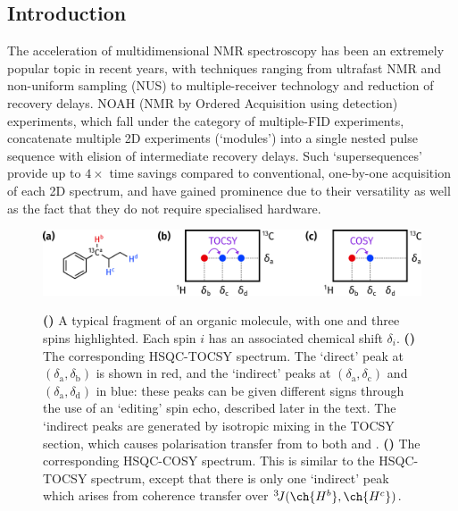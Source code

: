 \documentclass[a4paper,12pt]{article}
\newcommand{\proton}{\ch{^{1}H}}
\newcommand{\carbon}{\ch{^{13}C}}
\begin{document}
\begin{refsection}
\clearpage

\section{Introduction}

The acceleration of multidimensional NMR spectroscopy has been an extremely popular topic in recent years, with techniques ranging from ultrafast NMR\autocite{Frydman2002PNASUSA,Pelupessy2003JACS,Frydman2003JACS} and non-uniform sampling (NUS)\autocite{Kazimierczuk2010PNMRS,Mobli2014PNMRS,Kazimierczuk2015MRC} to multiple-receiver technology\autocite{Kupce2006JACS,Kupce2008JACS,Kovacs2016MRC} and reduction of recovery delays\autocite{Kupce2007MRC,SchulzeSunninghausen2014JACS,Becker2019JMR}.
NOAH (NMR by Ordered Acquisition using \proton{} detection) experiments\autocite{Kupce2017ACIE}, which fall under the category of multiple-FID experiments\autocite{Yong2023RSCBook}, concatenate multiple 2D experiments (`modules') into a single nested pulse sequence with elision of intermediate recovery delays.
Such `supersequences' provide up to $4\times$ time savings compared to conventional, one-by-one acquisition of each 2D spectrum, and have gained prominence due to their versatility as well as the fact that they do not require specialised hardware.

\begin{figure}[!ht]
    \centering
    \includegraphics[]{intro.png}%
    {\label{fig:intro_molecular_structure}}%
    {\label{fig:intro_hsqc_tocsy}}%
    {\label{fig:intro_hsqc_cosy}}%
    \caption[Mockup illustrating salient features of HSQC-TOCSY and -COSY spectra]{
        \textbf{()} A typical fragment of an organic molecule, with one \carbon{} and three \proton{} spins highlighted.
        Each spin $i$ has an associated chemical shift $\delta_i$.
        \textbf{()} The corresponding HSQC-TOCSY spectrum.
        The `direct' peak at $(\delta_{\mathrm{a}}, \delta_{\mathrm{b}})$ is shown in red, and the `indirect' peaks at $(\delta_{\mathrm{a}}, \delta_{\mathrm{c}})$ and $(\delta_{\mathrm{a}}, \delta_{\mathrm{d}})$ in blue: these peaks can be given different signs through the use of an `editing' spin echo, described later in the text.
        The `indirect peaks are generated by isotropic mixing in the TOCSY section, which causes polarisation transfer from  to both  and .
        \textbf{()} The corresponding HSQC-COSY spectrum.
        This is similar to the HSQC-TOCSY spectrum, except that there is only one `indirect' peak which arises from coherence transfer over ${}^3\!J(\ch{H^b},\ch{H^c})$.
    }
    \label{fig:intro}
\end{figure}


\end{refsection}
\end{document}

